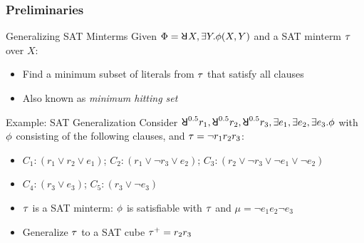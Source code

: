 \begin{frame}
    \frametitle{Preliminaries}
    \begin{block}{Generalizing SAT Minterms}
        Given $\Qf=\random{} X,\exists Y.\pf(X,Y)$ and a SAT minterm $\tau$ over $X$:
        \pause
        \begin{itemize}
            \item Find a minimum subset of literals from $\tau$ that satisfy all clauses
                  \pause
            \item Also known as \textit{minimum hitting set}
                  \pause
        \end{itemize}
    \end{block}
    \begin{block}{Example: SAT Generalization}
        Consider $\random{0.5}r_1,\random{0.5}r_2,\random{0.5}r_3,\exists e_1,\exists e_2,\exists e_3.\pf$ with $\phi$ consisting of the following clauses, and $\tau=\lnot r_1r_2r_3$:
        \begin{itemize}
            \item[] $C_1: (r_1 \lor r_2 \lor e_1)$; $C_2: (r_1 \lor \lnot r_3 \lor e_2)$; $C_3: (r_2 \lor \lnot r_3 \lor \lnot e_1 \lor \lnot e_2)$
            \item[] $C_4: (r_3 \lor e_3)$; $C_5: (r_3 \lor \lnot e_3)$
                  \pause
        \end{itemize}
        \begin{itemize}
            \item $\tau$ is a SAT minterm: $\phi$ is satisfiable with $\tau$ and $\mu=\lnot e_1e_2\lnot e_3$
                  \pause
            \item Generalize $\tau$ to a SAT cube $\tau^+=r_2r_3$
        \end{itemize}
    \end{block}
\end{frame}

